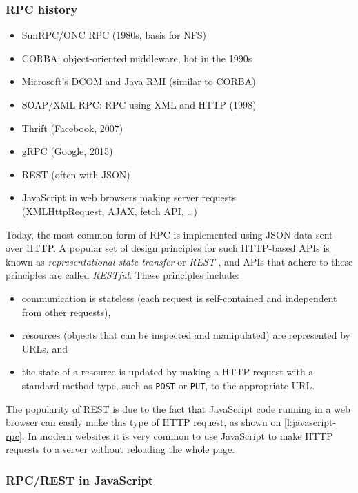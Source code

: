 \begin{frame}
    \label{s:rpc-history}
    \frametitle{RPC history}
    \begin{itemize}
        \item SunRPC/ONC RPC (1980s, basis for NFS)
        \item CORBA: object-oriented middleware, hot in the 1990s
        \item Microsoft's DCOM and Java RMI (similar to CORBA)
        \item SOAP/XML-RPC: RPC using XML and HTTP (1998)
        \item Thrift (Facebook, 2007)
        \item gRPC (Google, 2015)
        \item REST (often with JSON)
        \item JavaScript in web browsers making server requests \\
            (XMLHttpRequest, AJAX, fetch API, \dots)
    \end{itemize}
\end{frame}

Today, the most common form of RPC is implemented using JSON data sent over HTTP.
A popular set of design principles for such HTTP-based APIs is known as \emph{representational state transfer} or \emph{REST} \citep{Fielding:2000}, and APIs that adhere to these principles are called \emph{RESTful}.
These principles include:
\begin{itemize}
    \item communication is stateless (each request is self-contained and independent from other requests),
    \item resources (objects that can be inspected and manipulated) are represented by URLs, and
    \item the state of a resource is updated by making a HTTP request with a standard method type, such as \texttt{POST} or \texttt{PUT}, to the appropriate URL.
\end{itemize}
The popularity of REST is due to the fact that JavaScript code running in a web browser can easily make this type of HTTP request, as shown on \autoref{l:javascript-rpc}.
In modern websites it is very common to use JavaScript to make HTTP requests to a server without reloading the whole page.


\begin{frame}
    \label{s:javascript-rpc}
    \frametitle{RPC/REST in JavaScript}
    \inputminted{js}{code/payment-rpc.js}
\end{frame}
\label{l:javascript-rpc}

